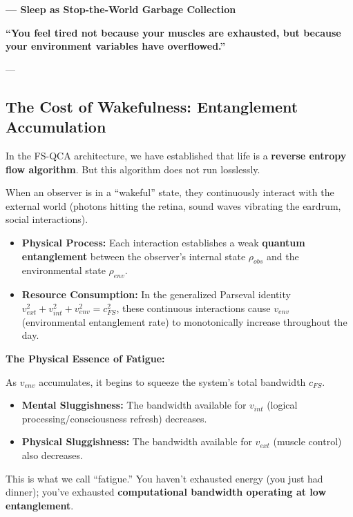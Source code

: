 \documentclass[11pt,a4paper,twoside]{book}
\begin{document}
\textbf{--- Sleep as Stop-the-World Garbage Collection}

\textbf{``You feel tired not because your muscles are exhausted, but because your environment variables have overflowed.''}

---

\subsection{The Cost of Wakefulness: Entanglement Accumulation}

In the FS-QCA architecture, we have established that life is a \textbf{reverse entropy flow algorithm}. But this algorithm does not run losslessly.

When an observer is in a ``wakeful'' state, they continuously interact with the external world (photons hitting the retina, sound waves vibrating the eardrum, social interactions).

\begin{itemize}
\item \textbf{Physical Process:} Each interaction establishes a weak \textbf{quantum entanglement} between the observer's internal state \textbf{$\rho_{obs}$} and the environmental state \textbf{$\rho_{env}$}.

\item \textbf{Resource Consumption:} In the generalized Parseval identity \textbf{$v_{ext}^2 + v_{int}^2 + v_{env}^2 = c_{FS}^2$}, these continuous interactions cause \textbf{$v_{env}$} (environmental entanglement rate) to monotonically increase throughout the day.
\end{itemize}

\textbf{The Physical Essence of Fatigue:}

As \textbf{$v_{env}$} accumulates, it begins to squeeze the system's total bandwidth \textbf{$c_{FS}$}.

\begin{itemize}
\item \textbf{Mental Sluggishness:} The bandwidth available for \textbf{$v_{int}$} (logical processing/consciousness refresh) decreases.

\item \textbf{Physical Sluggishness:} The bandwidth available for \textbf{$v_{ext}$} (muscle control) also decreases.
\end{itemize}

This is what we call ``fatigue.'' You haven't exhausted energy (you just had dinner); you've exhausted \textbf{computational bandwidth operating at low entanglement}.
\end{document}
